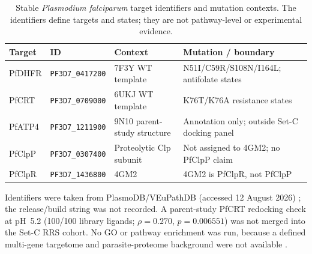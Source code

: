 \documentclass[journal=jcisd8,manuscript=suppinfo,layout=traditional]{achemso}
\begin{document}
\begin{table}[htbp]
\centering
\scriptsize
\setlength{\tabcolsep}{0pt}
\caption{Stable \textit{Plasmodium falciparum} target identifiers and mutation contexts. The identifiers define targets and states; they are not pathway-level or experimental evidence.}
\label{tab:s5_plasmodb}
\begin{tabularx}{\textwidth}{>{\raggedright\arraybackslash}p{} >{\raggedright\arraybackslash}p{} >{\raggedright\arraybackslash}p{} X}
\toprule
Target & ID & Context & Mutation / boundary \\
\midrule
PfDHFR & \scriptsize\texttt{PF3D7\_0417200}\normalsize & 7F3Y WT template & N51I/C59R/S108N/I164L; antifolate states \\
PfCRT & \scriptsize\texttt{PF3D7\_0709000}\normalsize & 6UKJ WT template & K76T/K76A resistance states \\
PfATP4 & \scriptsize\texttt{PF3D7\_1211900}\normalsize & 9N10 parent-study structure & Annotation only; outside Set-C docking panel \\
PfClpP & \scriptsize\texttt{PF3D7\_0307400}\normalsize & Proteolytic Clp subunit & Not assigned to 4GM2; no PfClpP claim \\
PfClpR & \scriptsize\texttt{PF3D7\_1436800}\normalsize & 4GM2 & 4GM2 is PfClpR, not PfClpP \\
\bottomrule
\end{tabularx}
\normalsize
\setlength{\tabcolsep}{6pt}
\end{table}

Identifiers were taken from PlasmoDB/VEuPathDB (accessed 12 August 2026) \citep{plasmodb_2026}; the release/build string was not recorded. A parent-study PfCRT redocking check at pH~5.2 (100/100 library ligands; $\rho = 0.270$, $p = 0.006551$) was not merged into the Set-C RRS cohort. No GO or pathway enrichment was run, because a defined multi-gene targetome and parasite-proteome background were not available \citep{Trapotsi2022MoA}.

\end{document}
